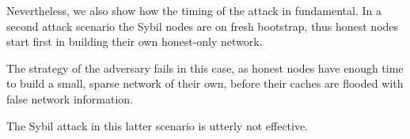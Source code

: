 Nevertheless, we also show how the timing of the attack in fundamental. In a second attack scenario the Sybil nodes are on fresh bootstrap, thus honest nodes start first in building their own honest-only network.

The strategy of the adversary fails in this case, as honest nodes have enough time to build a small, sparse network of their own, before their caches are flooded with false network information.

The Sybil attack in this latter scenario is utterly not effective.





